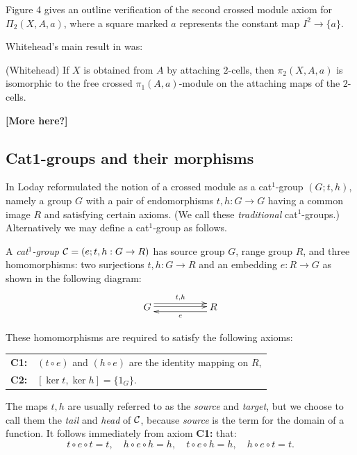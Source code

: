 Figure 4 gives an outline verification of the second crossed module axiom
for $\Pi_2(X,A,a)$, where a square marked $a$ represents the constant 
map  $I^2 \to \{a\}$.

Whitehead's main result in \cite{W-41,W-46,W-49a} was:
\begin{thm} {\rm (Whitehead)} \label{thm:W} 
If  $X$  is obtained from  $A$  by attaching $2$-cells, 
then  $\pi_2(X,A,a)$  is isomorphic to the free crossed
$\pi_1(A,a)$-module on the attaching maps of the $2$-cells.
\end{thm}

\noindent
{\bf [More here?]}





\subsection{Cat1-groups and their morphisms} 
\label{subs:cat1}  

In \cite{loday1} Loday reformulated the notion of a 
crossed module as a cat$^1$-group $(G;t,h)$, 
namely a group $G$ with a pair of endomorphisms $t,h : G \to G$
having a common image $R$ and satisfying certain axioms. 
(We call these \emph{traditional} cat$^1$-groups.) 
Alternatively we may define a cat$^1$-group as follows. 

\begin{defn} \label{defn:cat1-group}
A \emph{cat$^1$-group} $\mathcal{C} = (e;t,h : G \to R )$  
has source group $G$, range group $R$, and three homomorphisms:  
two surjections  $t,h : G \to R$ and an embedding  $e : R \to G$ 
as shown in the following diagram:
$$
\xymatrix{
 G  \ar[rr] <1.0ex>^{t,h} \ar[rr] <0.2ex>
   &&  R \ar[ll] <1.0ex>^e \\
}
$$

\noindent
These homomorphisms are required to satisfy the following axioms:
\begin{center}
\begin{tabular}{r l}
\textbf{C1:}  &  $(t \circ e)$ and $(h \circ e)$ 
are the identity mapping on $R$, \\
\textbf{C2:}  &  $[\ker t, \ker h] = \{ 1_G \}$.
\end{tabular}
\end{center}
\end{defn} 

The maps  $t,h$  are usually referred to as the 
  
\emph{source} and \emph{target}, but we choose to call them the 
\emph{tail} and \emph{head} of  $\mathcal{C}$, 
because \emph{source} is the {\GAP} term for the domain of a function. 
It follows immediately from axiom {\bf C1:} that: 
$$
t \circ e \circ t = t,\quad h \circ e \circ h = h,\quad 
t \circ e \circ h = h,\quad h \circ e \circ t = t.
$$

